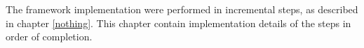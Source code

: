 
The framework implementation were performed in incremental steps, as described in chapter \ref{nothing}. This chapter contain implementation details of the steps in order of completion.

